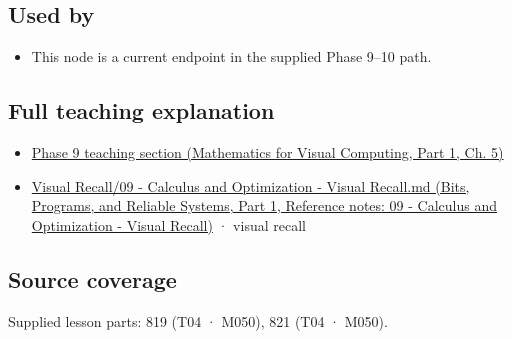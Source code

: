 \subsection{Used by}\label{appendix-e2d476574aab-used-by}

\hypertarget{appendix-e2d476574aab-used-by}{}

\begin{itemize}
\tightlist
\item
  This node is a current endpoint in the supplied Phase 9--10 path.
\end{itemize}

\subsection{Full teaching explanation}\label{appendix-e2d476574aab-full-teaching-explanation}

\hypertarget{appendix-e2d476574aab-full-teaching-explanation}{}

\begin{itemize}
\tightlist
\item
  \href{../02-Mathematics-for-Visual-Computing-P01/main.pdf\#nameddest=02-foundations-ii-ch021-multivariable-derivatives-and-sensitivity-1}{Phase 9 teaching section (Mathematics for Visual Computing, Part 1, Ch. 5)}
\item
  \href{../01-Bits-Programs-and-Reliable-Systems-P01/main.pdf\#nameddest=appendix-adf48f5dc5c1}{Visual Recall/09 - Calculus and Optimization - Visual Recall.md (Bits, Programs, and Reliable Systems, Part 1, Reference notes: 09 - Calculus and Optimization - Visual Recall)} · visual recall
\end{itemize}

\subsection{Source coverage}\label{appendix-e2d476574aab-source-coverage}

\hypertarget{appendix-e2d476574aab-source-coverage}{}

Supplied lesson parts: 819 (T04 · M050), 821 (T04 · M050).
